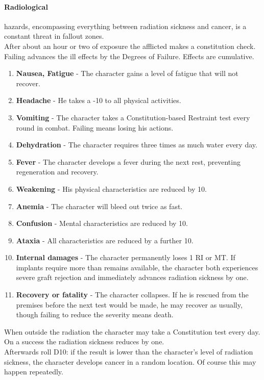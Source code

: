 \documentclass[12pt,a4paper,openany,usenames,dvipsnames]{book}
\begin{document}
	\paragraph{Radiological} hazards, encompassing everything between radiation sickness and cancer, is a constant threat in fallout zones.\\
	After about an hour or two of exposure the afflicted makes a constitution check. Failing advances the ill effects by the Degrees of Failure.
	Effects are cumulative.
	\begin{enumerate}
		\setlength\itemsep{-10mm}
		\item \textbf{Nausea, Fatigue} - The character gains a level of fatigue that will not recover.
		\item \textbf{Headache} - He takes a -10 to all physical activities.
		\item \textbf{Vomiting} - The character takes a Constitution-based Restraint test every round in combat. Failing means losing his actions.
		\item \textbf{Dehydration} - The character requires three times as much water every day.
		\item \textbf{Fever} - The character develops a fever during the next rest, preventing regeneration and recovery.
		\item \textbf{Weakening} - His physical characteristics are reduced by 10.
		\item \textbf{Anemia} - The character will bleed out twice as fast.
		\item \textbf{Confusion} - Mental characteristics are reduced by 10.
		\item \textbf{Ataxia} - All characteristics are reduced by a further 10.
		\item \textbf{Internal damages} - The character permanently loses 1 RI or MT. If implants require more than remains available, the character both experiences severe graft rejection and immediately advances radiation sickness by one.
		\item \textbf{Recovery or fatality} - The character collapses. If he is rescued from the premises before the next test would be made, he may recover as usually, though failing to reduce the severity means death.
	\end{enumerate}
	\par
	When outside the radiation the character may take a Constitution test every day. On a success the radiation sickness reduces by one.\\
	Afterwards roll D10: if the result is lower than the character's level of radiation sickness, the character develops cancer in a random location.
	Of course this may happen repeatedly.
\end{document}
